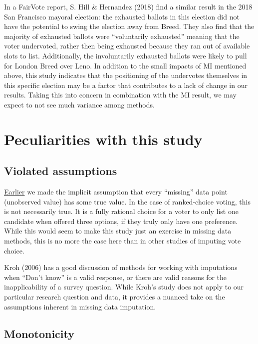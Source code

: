 \documentclass[12pt,twoside]{reedthesis}
\begin{document}
In a FairVote report, S. Hill \& Hernandez (2018) find a similar result in the 2018 San Francisco mayoral election: the exhausted ballots in this election did not have the potential to swing the election away from Breed. They also find that the majority of exhausted ballots were ``voluntarily exhausted'' meaning that the voter undervoted, rather then being exhausted because they ran out of available slots to list. Additionally, the involuntarily exhausted ballots were likely to pull for London Breed over Leno. In addition to the small impacts of MI mentioned above, this study indicates that the positioning of the undervotes themselves in this specific election may be a factor that contributes to a lack of change in our results. Taking this into concern in combination with the MI result, we may expect to not see much variance among methods.

\hypertarget{peculiarities-with-this-study}{%
\section{Peculiarities with this study}\label{peculiarities-with-this-study}}

\hypertarget{violated-assumptions}{%
\subsection{Violated assumptions}\label{violated-assumptions}}

\protect\hyperlink{missing-data}{Earlier} we made the implicit assumption that every ``missing'' data point (unobserved value) has some true value. In the case of ranked-choice voting, this is not necessarily true. It is a fully rational choice for a voter to only list one candidate when offered three options, if they truly only have one preference. While this would seem to make this study just an exercise in missing data methods, this is no more the case here than in other studies of imputing vote choice.

Kroh (2006) has a good discussion of methods for working with imputations when ``Don't know'' is a valid response, or there are valid reasons for the inapplicability of a survey question. While Kroh's study does not apply to our particular research question and data, it provides a nuanced take on the assumptions inherent in missing data imputation.

\hypertarget{monotonicity}{%
\subsection{Monotonicity}\label{monotonicity}}
\end{document}
